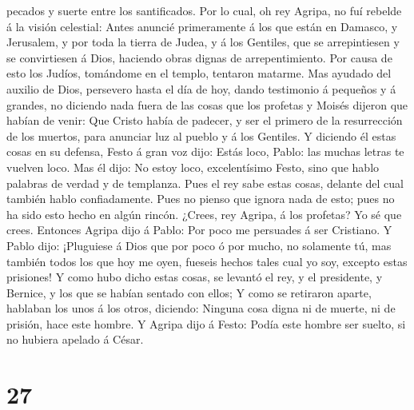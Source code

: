 pecados y suerte entre los santificados.  Por lo cual, oh
rey Agripa, no fuí rebelde á la visión celestial:  Antes
anuncié primeramente á los que están en Damasco, y Jerusalem, y por toda
la tierra de Judea, y á los Gentiles, que se arrepintiesen y se
convirtiesen á Dios, haciendo obras dignas de arrepentimiento.
 Por causa de esto los Judíos, tomándome en el templo,
tentaron matarme.  Mas ayudado del auxilio de Dios,
persevero hasta el día de hoy, dando testimonio á pequeños y á grandes,
no diciendo nada fuera de las cosas que los profetas y Moisés dijeron
que habían de venir:  Que Cristo había de padecer, y ser
el primero de la resurrección de los muertos, para anunciar luz al
pueblo y á los Gentiles.  Y diciendo él estas cosas en su
defensa, Festo á gran voz dijo: Estás loco, Pablo: las muchas letras te
vuelven loco.  Mas él dijo: No estoy loco, excelentísimo
Festo, sino que hablo palabras de verdad y de templanza. 
Pues el rey sabe estas cosas, delante del cual también hablo
confiadamente. Pues no pienso que ignora nada de esto; pues no ha sido
esto hecho en algún rincón.  ¿Crees, rey Agripa, á los
profetas? Yo sé que crees.  Entonces Agripa dijo á Pablo:
Por poco me persuades á ser Cristiano.  Y Pablo dijo:
¡Pluguiese á Dios que por poco ó por mucho, no solamente tú, mas también
todos los que hoy me oyen, fueseis hechos tales cual yo soy, excepto
estas prisiones!  Y como hubo dicho estas cosas, se
levantó el rey, y el presidente, y Bernice, y los que se habían sentado
con ellos;  Y como se retiraron aparte, hablaban los unos
á los otros, diciendo: Ninguna cosa digna ni de muerte, ni de prisión,
hace este hombre.  Y Agripa dijo á Festo: Podía este
hombre ser suelto, si no hubiera apelado á César.

\hypertarget{section-26}{%
\section{27}\label{section-26}}

